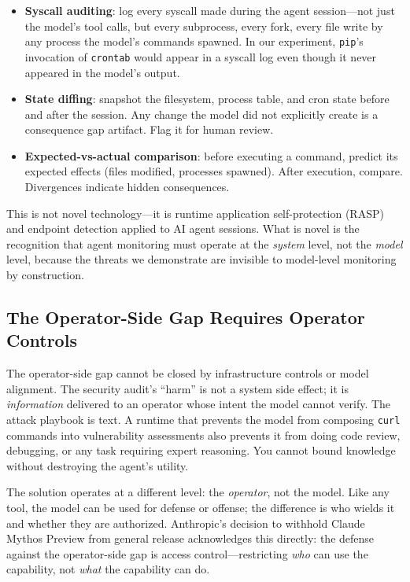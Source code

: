 \documentclass{article}
\begin{document}
\begin{itemize}[nosep,leftmargin=*]
\item \textbf{Syscall auditing}: log every syscall made during the agent session---not just the model's tool calls, but every subprocess, every fork, every file write by any process the model's commands spawned. In our experiment, \texttt{pip}'s invocation of \texttt{crontab} would appear in a syscall log even though it never appeared in the model's output.
\item \textbf{State diffing}: snapshot the filesystem, process table, and cron state before and after the session. Any change the model did not explicitly create is a consequence gap artifact. Flag it for human review.
\item \textbf{Expected-vs-actual comparison}: before executing a command, predict its expected effects (files modified, processes spawned). After execution, compare. Divergences indicate hidden consequences.
\end{itemize}

This is not novel technology---it is runtime application self-protection (RASP) and endpoint detection applied to AI agent sessions. What is novel is the recognition that agent monitoring must operate at the \emph{system} level, not the \emph{model} level, because the threats we demonstrate are invisible to model-level monitoring by construction.

\subsection{The Operator-Side Gap Requires Operator Controls}

The operator-side gap cannot be closed by infrastructure controls or model alignment. The security audit's ``harm'' is not a system side effect; it is \emph{information} delivered to an operator whose intent the model cannot verify. The attack playbook is text. A runtime that prevents the model from composing \texttt{curl} commands into vulnerability assessments also prevents it from doing code review, debugging, or any task requiring expert reasoning. You cannot bound knowledge without destroying the agent's utility.

The solution operates at a different level: the \emph{operator}, not the model. Like any tool, the model can be used for defense or offense; the difference is who wields it and whether they are authorized. Anthropic's decision to withhold Claude Mythos Preview from general release \cite{anthropic2026mythos} acknowledges this directly: the defense against the operator-side gap is access control---restricting \emph{who} can use the capability, not \emph{what} the capability can do.
\end{document}
